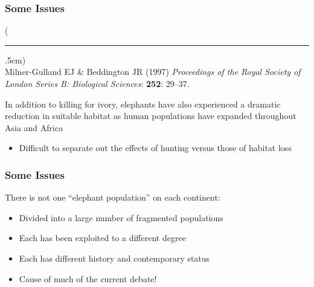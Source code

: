 \documentclass[10pt]{beamer}
\newenvironment{reference}[2]{%
	\begin{textblock*}{\textwidth}(#1,#2)
		\tiny\bgroup\color{gray}}{\egroup\end{textblock*}}
\begin{document}
\begin{frame}[t]
\frametitle{Some Issues}
\vspace{0.5cm}
	
	\begin{reference}{4mm}{90mm}
		\rule{1.5cm}{0.25pt}\\
		Milner-Gulland EJ \& Beddington JR (1997) \emph{Proceedings of the Royal Society of London Series B: Biological Sciences}: \textbf{252}: 29--37.
	\end{reference}

	
	In addition to killing for ivory, elephants have also experienced a dramatic reduction in suitable habitat as human populations have expanded throughout Asia and Africa\\
	
	\medskip
	
	\begin{itemize}
		\item Difficult to separate out the effects of hunting versus those of habitat loss
	\end{itemize}
\end{frame}


\begin{frame}[t]
\frametitle{Some Issues}
\vspace{0.5cm}
		
	There is not one ``elephant population'' on each continent:
	
	\medskip
	
	\begin{itemize}
		\item Divided into a large number of fragmented populations
		\medskip
		\item Each has been exploited to a different degree
		\medskip
		\item Each has different history and contemporary status
		\medskip
		\item Cause of much of the current debate!
	\end{itemize}
\end{frame}
\end{document}
